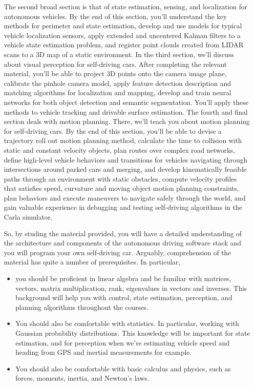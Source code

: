The second broad section is that of state estimation, sensing, and localization for autonomous vehicles. By the end of this section, you'll understand the key methods for perimeter and state estimation, develop and use models for typical vehicle localization sensors, apply extended and uncentered Kalman filters to a vehicle state estimation problem, and register point clouds created from LIDAR scans to a 3D map of a static environment. In the third section, we'll discuss about visual perception for self-driving cars. After completing the relevant material, you'll be able to project 3D points onto the camera image plane, calibrate the pinhole camera model, apply feature detection description and matching algorithms for localization and mapping, develop and train neural networks for both object detection and semantic segmentation. You'll apply these methods to vehicle tracking and drivable surface estimation. The fourth and final section deals with motion planning. There,  we'll teach you about motion planning for self-driving cars. By the end of this section, you'll be able to devise a trajectory roll out motion planning method, calculate the time to collision with static and constant velocity objects, plan routes over complex road networks, define high-level vehicle behaviors and transitions for vehicles navigating through intersections around parked cars and merging, and develop kinematically feasible paths through an environment with static obstacles, compute velocity profiles that satisfies speed, curvature and moving object motion planning constraints, plan behaviors and execute maneuvers to navigate safely through the world, and gain valuable experience in debugging and testing self-driving algorithms in the Carla simulator. 


So, by studing the material provided, you will have a detailed understanding of the architecture and components of the autonomous driving software stack and you will program your own self-driving car. 
Arguably, comprehension of the material has quite a number of prerequisites. In particular,

\begin{itemize}
\item you should be proficient in linear algebra and be familiar with matrices, vectors, matrix multiplication, rank, eigenvalues in vectors and inverses. This background will help you with control, state estimation, perception, and planning algorithms throughout the courses.
\item  You should also be comfortable with statistics. In particular, working with Gaussian probability distributions. This knowledge will be important for state estimation, and for perception when we're estimating vehicle speed and heading from GPS and inertial measurements for example. 
\item You should also be comfortable with basic calculus and physics, such as forces, moments, inertia, and Newton's laws.  
\end{itemize}


